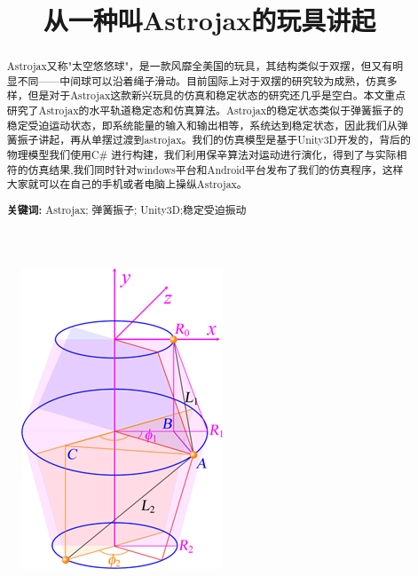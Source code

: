 \documentclass[12pt,a4paper]{ctexart}
\title{\kaishu \Huge 从一种叫Astrojax的玩具讲起}
\date{}
\begin{document}
	\maketitle
	\begin{figure}[h] %
		\centering %
		\includegraphics[scale=2.5]{T07.png} %
	\end{figure}%
	
	
	\clearpage
	\renewcommand{\baselinestretch}{0.9}
	
	\begin{abstract}
		Astrojax又称"太空悠悠球"，是一款风靡全美国的玩具，其结构类似于双摆，但又有明显不同——中间球可以沿着绳子滑动。目前国际上对于双摆的研究较为成熟，仿真多样，但是对于Astrojax这款新兴玩具的仿真和稳定状态的研究还几乎是空白。本文重点研究了Astrojax的水平轨道稳定态和仿真算法。Astrojax的稳定状态类似于弹簧振子的稳定受迫运动状态，即系统能量的输入和输出相等，系统达到稳定状态，因此我们从弹簧振子讲起，再从单摆过渡到astrojax。我们的仿真模型是基于Unity3D开发的，背后的物理模型我们使用C\# 进行构建，我们利用保辛算法对运动进行演化，得到了与实际相符的仿真结果,我们同时针对windows平台和Android平台发布了我们的仿真程序，这样大家就可以在自己的手机或者电脑上操纵Astrojax。

		\par\textbf{关键词: } Astrojax; 弹簧振子; Unity3D;稳定受迫振动%
	\end{abstract}
	\newpage%
	\clearpage
	\renewcommand{\baselinestretch}{0.9}
	\thispagestyle{empty}
	\tableofcontents
\end{document}
